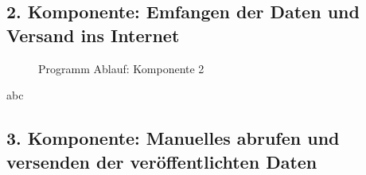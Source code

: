 \newpage

\subsection{2. Komponente: Emfangen der Daten und Versand ins Internet} \label{Empfänger}

\begin{center}
	\begin{figure}[h]
	 
	 \noindent{}
	 \caption[PAP komponente 2]{Programm Ablauf: Komponente 2}
	 \label{fig:lorareadwifisend}
	\end{figure}
\end{center}

abc

\newpage

\subsection{3. Komponente: Manuelles abrufen und versenden der veröffentlichten Daten} \label{PubSub}


